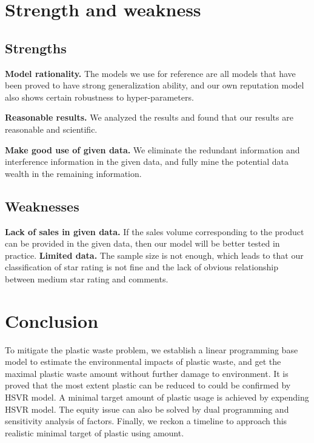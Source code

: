 \documentclass{mcmthesis}
\begin{document}
\section{Strength and weakness}

\subsection{Strengths}
\textbf{Model rationality.} The models we use for reference are all models that have been proved to have strong generalization ability, and our own reputation model also shows certain robustness to hyper-parameters.

\textbf{Reasonable results.} We analyzed the results and found that our results are reasonable and scientific.

\textbf{Make good use of given data.} We eliminate the redundant information and interference information in the given data, and fully mine the potential data wealth in the remaining information.

\subsection{Weaknesses}
\textbf{Lack of sales in given data.} If the sales volume corresponding to the product can be provided in the given data, then our model will be better tested in practice.
\textbf{Limited data.} The sample size is not enough, which leads to that our classification of star rating is not fine and the lack of obvious relationship between medium star rating and comments.
\section{Conclusion}

To mitigate the plastic waste problem, we establish a linear programming base model to estimate the environmental impacts of plastic waste, and get the maximal plastic waste amount without further damage to environment. It is proved that the most extent plastic can be reduced to could be confirmed by HSVR model. A minimal target amount of plastic usage is achieved by expending HSVR model. The equity issue can also be solved by dual programming and sensitivity analysis of factors. Finally, we reckon a timeline to approach this realistic minimal target of plastic using amount. 

\newpage
\end{document}
